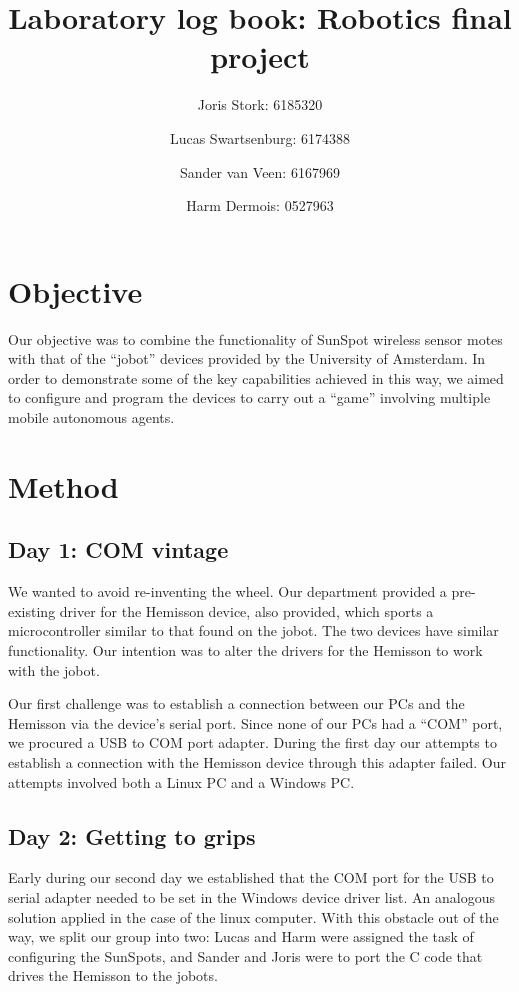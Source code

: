 \documentclass[a4paper, 12pt, titlepage]{article}
\author{Joris Stork: 6185320 \and Lucas Swartsenburg: 6174388 \and Sander van
Veen: 6167969 \and Harm Dermois: 0527963}
\title{Laboratory log book: Robotics final project}
\begin{document}
\maketitle

\section{Objective} %

Our objective was to combine the functionality of SunSpot wireless sensor
motes with that of the ``jobot'' devices provided by the University of
Amsterdam. In order to demonstrate some of the key capabilities achieved in this
way, we aimed to configure and program the devices to carry out a ``game''
involving multiple mobile autonomous agents.


\section{Method} %


\subsection{Day 1: COM vintage} %

We wanted to avoid re-inventing the wheel. Our department provided a
pre-existing driver for the Hemisson device, also provided, which sports a
microcontroller similar to that found on the jobot. The two devices have similar
functionality. Our intention was to alter the drivers for the Hemisson to work
with the jobot.

Our first challenge was to establish a connection between our PCs and the
Hemisson via the device's serial port. Since none of our PCs had a ``COM'' port,
we procured a USB to COM port adapter. During the first day our attempts to
establish a connection with the Hemisson device through this adapter failed. Our
attempts involved both a Linux PC and a Windows PC.


\subsection{Day 2: Getting to grips} %

Early during our second day we established that the COM port for the USB to
serial adapter needed to be set in the Windows device driver list. An analogous
solution applied in the case of the linux computer. With this obstacle out of
the way, we split our
group into two: Lucas and Harm were assigned the task of configuring the
SunSpots, and Sander and Joris were to port the C code that drives the Hemisson
to the jobots. 
\end{document}
